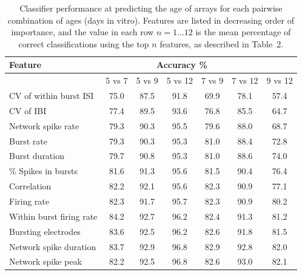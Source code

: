 \documentclass{article}
\begin{document}
\begin{table}
  \centering
  \begin{tabular}{|l|c|c|c|c|c|c|}
	  \hline
	  \textbf{Feature} & \multicolumn{5}{c}{\textbf{Accuracy \%}} & 
	  \\ \hline
	  & 5 vs 7 & 5 vs 9 & 5 vs 12 & 7 vs 9 & 7 vs 12 & 9 vs 12
	  \\ \hline 
		CV of within burst ISI & 75.0 & 87.5 & 91.8 & 69.9& 78.1 & 57.4
		\\ CV of IBI & 77.4 & 89.5 & 93.6 & 76.8 & 85.5 & 64.7
		\\ Network spike rate& 79.3 & 90.3 & 95.5  & 79.6 & 88.0 & 68.7
		\\ Burst rate & 79.3 & 90.3 & 95.3 & 81.0 & 88.4 & 72.8
		\\ Burst duration& 79.7 & 90.8 & 95.3 & 81.0 & 88.6 & 74.0
		\\ \% Spikes in bursts & 81.6 & 91.3 & 95.6 & 81.5 & 90.4 & 76.4
		\\ Correlation & 82.2 & 92.1 & 95.6 & 82.3 & 90.9 & 77.1
		\\ Firing rate & 82.3 & 91.7 & 95.7 & 82.3 & 90.9 & 80.2
		\\ Within burst firing rate & 84.2 & 92.7 & 96.2 & 82.4 & 91.3 & 81.2
		\\ Bursting electrodes & 83.6 & 92.5 & 96.2 & 82.6 & 91.8 & 81.5
		\\ Network spike duration & 83.7 & 92.9 & 96.8 & 82.9 & 92.8 & 82.0
		\\ Network spike peak & 82.2 & 92.5 & 96.8 & 82.6 & 93.0 & 82.1
	\\ \hline
\end{tabular}
  \caption{Classifier performance at predicting the age of arrays for
    each pairwise combination of ages (days in vitro). Features are listed in
    decreasing order of importance, and the value in each row
    $n=1 \ldots 12$ is the mean percentage of correct classifications using
    the top $n$ features, as described in Table~2.}
\end{table}
\end{document}
